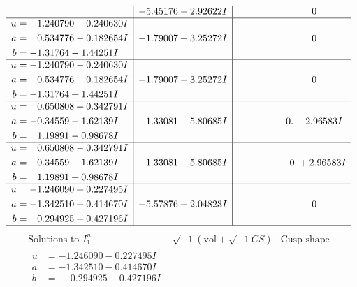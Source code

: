 \documentclass[1p]{elsarticle_modified}
\theoremstyle{definition}
\newcommand{\I}{\sqrt{-1}}
\begin{document}
$$\begin{array}{c|c|c}
 & -5.45176 - 2.92622 I & \phantom{-0.000000 } 0 \\ \hline\begin{aligned}
u &= -1.240790 + 0.240630 I \\
a &= \phantom{-}0.534776 - 0.182654 I \\
b &= -1.31764 - 1.44251 I\end{aligned}
 & -1.79007 + 3.25272 I & \phantom{-0.000000 } 0 \\ \hline\begin{aligned}
u &= -1.240790 - 0.240630 I \\
a &= \phantom{-}0.534776 + 0.182654 I \\
b &= -1.31764 + 1.44251 I\end{aligned}
 & -1.79007 - 3.25272 I & \phantom{-0.000000 } 0 \\ \hline\begin{aligned}
u &= \phantom{-}0.650808 + 0.342791 I \\
a &= -0.34559 - 1.62139 I \\
b &= \phantom{-}1.19891 - 0.98678 I\end{aligned}
 & \phantom{-}1.33081 + 5.80685 I & \phantom{-0.000000 } 0. - 2.96583 I \\ \hline\begin{aligned}
u &= \phantom{-}0.650808 - 0.342791 I \\
a &= -0.34559 + 1.62139 I \\
b &= \phantom{-}1.19891 + 0.98678 I\end{aligned}
 & \phantom{-}1.33081 - 5.80685 I & \phantom{-0.000000 -}0. + 2.96583 I \\ \hline\begin{aligned}
u &= -1.246090 + 0.227495 I \\
a &= -1.342510 + 0.414670 I \\
b &= \phantom{-}0.294925 + 0.427196 I\end{aligned}
 & -5.57876 + 2.04823 I & \phantom{-0.000000 } 0\\
 \hline 
 \end{array}$$\newpage$$\begin{array}{c|c|c}  
\text{Solutions to }I^u_{1}& \I (\text{vol} + \sqrt{-1}CS) & \text{Cusp shape}\\
 \hline 
\begin{aligned}
u &= -1.246090 - 0.227495 I \\
a &= -1.342510 - 0.414670 I \\
b &= \phantom{-}0.294925 - 0.427196 I\end{aligned}

\end{array}$$
\end{document}
